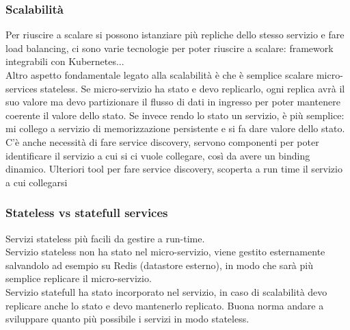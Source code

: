 \documentclass{article}
\begin{document}
\subsubsection{Scalabilità}
Per riuscire a scalare si possono istanziare più repliche dello stesso servizio e fare load balancing, ci sono varie tecnologie per poter riuscire a scalare: framework integrabili con Kubernetes...\\ Altro aspetto fondamentale legato alla scalabilità è che è semplice scalare micro-services stateless. Se micro-servizio ha stato e devo replicarlo, ogni replica avrà il suo valore ma devo partizionare il flusso di dati in ingresso per poter mantenere coerente il valore dello stato. Se invece rendo lo stato un servizio, è più semplice: mi collego a servizio di memorizzazione persistente e si fa dare valore dello stato.\\ C'è anche necessità di fare service discovery, servono componenti per poter identificare il servizio a cui si ci vuole collegare, così da avere un binding dinamico. Ulteriori tool per fare service discovery, scoperta a run time il servizio a cui collegarsi
\subsubsection{Stateless vs statefull services}
Servizi stateless più facili da gestire a run-time.\\ Servizio stateless non ha stato nel micro-servizio, viene gestito esternamente salvandolo ad esempio su Redis (datastore esterno), in modo che sarà più semplice replicare il micro-servizio.\\ Servizio statefull ha stato incorporato nel servizio, in caso di scalabilità devo replicare anche lo stato e devo mantenerlo replicato. Buona norma andare a sviluppare quanto più possibile i servizi in modo stateless.
\end{document}
